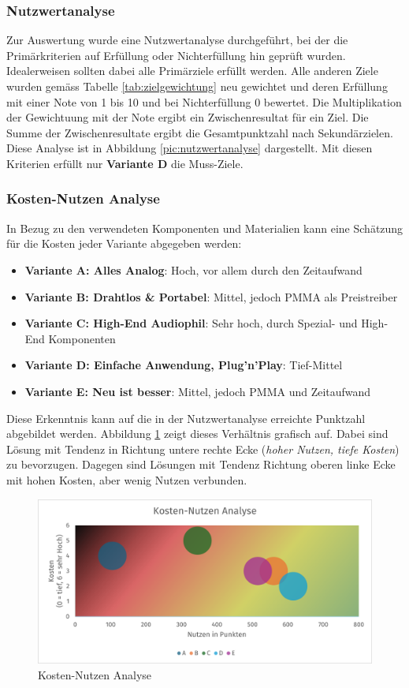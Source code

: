 \subsubsection{Nutzwertanalyse}Zur Auswertung wurde eine Nutzwertanalyse durchgeführt, bei der die Primärkriterien auf Erfüllung oder Nichterfüllung hin geprüft wurden. Idealerweisen sollten dabei alle Primärziele erfüllt werden. Alle anderen Ziele wurden gemäss Tabelle \ref{tab:zielgewichtung} neu gewichtet und deren Erfüllung mit einer Note von 1 bis 10 und bei Nichterfüllung 0 bewertet. Die Multiplikation der Gewichtuung mit der Note ergibt ein Zwischenresultat für ein Ziel. Die Summe der Zwischenresultate ergibt die Gesamtpunktzahl nach Sekundärzielen. Diese Analyse ist in Abbildung \ref{pic:nutzwertanalyse} dargestellt. Mit diesen Kriterien erfüllt nur \textbf{Variante D} die Muss-Ziele.
\subsubsection{Kosten-Nutzen Analyse}
In Bezug zu den verwendeten Komponenten und Materialien kann eine Schätzung für die Kosten jeder Variante abgegeben werden:
\begin{itemize}
	\item \textbf{Variante A: Alles Analog}: Hoch, vor allem durch den Zeitaufwand
	\item \textbf{Variante B: Drahtlos \& Portabel}: Mittel, jedoch PMMA als Preistreiber
	\item \textbf{Variante C: High-End Audiophil}: Sehr hoch, durch Spezial- und High-End Komponenten
	\item \textbf{Variante D: Einfache Anwendung, Plug’n’Play}: Tief-Mittel
	\item \textbf{Variante E: Neu ist besser}: Mittel, jedoch PMMA und Zeitaufwand
\end{itemize}
Diese Erkenntnis kann auf die in der Nutzwertanalyse erreichte Punktzahl abgebildet werden. Abbildung \ref{pic:kostennutzen} zeigt dieses Verhältnis grafisch auf. Dabei sind Lösung mit Tendenz in Richtung untere rechte Ecke (\textit{hoher Nutzen, tiefe Kosten}) zu bevorzugen. Dagegen sind Lösungen mit Tendenz Richtung oberen linke Ecke mit hohen Kosten, aber wenig Nutzen verbunden.
\begin{figure}[H]
	\centering
	\includegraphics[width=\textwidth - 2cm]{pictures/Kostennutzenanalyse.png}
	\caption{Kosten-Nutzen Analyse}
	\label{pic:kostennutzen}
\end{figure}
